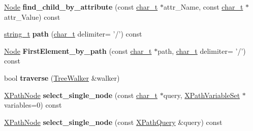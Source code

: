\begin{DoxyCompactItemize}
\item 
\hypertarget{classphys_1_1xml_1_1Node_abac54c450e3c50b3d73a0fafe6b4bafd}{
\hyperlink{classphys_1_1xml_1_1Node}{Node} {\bfseries find\_\-child\_\-by\_\-attribute} (const \hyperlink{namespacephys_1_1xml_afc87705cd1c2917d87b879715a2d8f6e}{char\_\-t} $\ast$attr\_\-Name, const \hyperlink{namespacephys_1_1xml_afc87705cd1c2917d87b879715a2d8f6e}{char\_\-t} $\ast$attr\_\-Value) const }
\label{d7/d0a/classphys_1_1xml_1_1Node_abac54c450e3c50b3d73a0fafe6b4bafd}

\item 
\hypertarget{classphys_1_1xml_1_1Node_a74b9f51a6642808510e71f643cc861ad}{
\hyperlink{namespacephys_1_1xml_a6db751f2b35502e04c123bb70daa0d20}{string\_\-t} {\bfseries path} (\hyperlink{namespacephys_1_1xml_afc87705cd1c2917d87b879715a2d8f6e}{char\_\-t} delimiter= '/') const }
\label{d7/d0a/classphys_1_1xml_1_1Node_a74b9f51a6642808510e71f643cc861ad}

\item 
\hypertarget{classphys_1_1xml_1_1Node_ad53eb05b9c0c2ac9388f5207c38ca98e}{
\hyperlink{classphys_1_1xml_1_1Node}{Node} {\bfseries FirstElement\_\-by\_\-path} (const \hyperlink{namespacephys_1_1xml_afc87705cd1c2917d87b879715a2d8f6e}{char\_\-t} $\ast$path, \hyperlink{namespacephys_1_1xml_afc87705cd1c2917d87b879715a2d8f6e}{char\_\-t} delimiter= '/') const }
\label{d7/d0a/classphys_1_1xml_1_1Node_ad53eb05b9c0c2ac9388f5207c38ca98e}

\item 
\hypertarget{classphys_1_1xml_1_1Node_abf6c5b96ced5404a204a4700f044f982}{
bool {\bfseries traverse} (\hyperlink{classphys_1_1xml_1_1TreeWalker}{TreeWalker} \&walker)}
\label{d7/d0a/classphys_1_1xml_1_1Node_abf6c5b96ced5404a204a4700f044f982}

\item 
\hypertarget{classphys_1_1xml_1_1Node_ad3caa2f4cafd56c79000a5af848f3e62}{
\hyperlink{classphys_1_1xml_1_1XPathNode}{XPathNode} {\bfseries select\_\-single\_\-node} (const \hyperlink{namespacephys_1_1xml_afc87705cd1c2917d87b879715a2d8f6e}{char\_\-t} $\ast$query, \hyperlink{classphys_1_1xml_1_1XPathVariableSet}{XPathVariableSet} $\ast$variables=0) const }
\label{d7/d0a/classphys_1_1xml_1_1Node_ad3caa2f4cafd56c79000a5af848f3e62}

\item 
\hypertarget{classphys_1_1xml_1_1Node_a599ed26773b23999c6f2e87e76deb0fd}{
\hyperlink{classphys_1_1xml_1_1XPathNode}{XPathNode} {\bfseries select\_\-single\_\-node} (const \hyperlink{classphys_1_1xml_1_1XPathQuery}{XPathQuery} \&query) const }
\label{d7/d0a/classphys_1_1xml_1_1Node_a599ed26773b23999c6f2e87e76deb0fd}


\end{DoxyCompactItemize}

